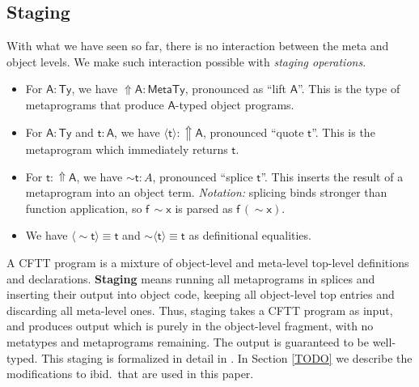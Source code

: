 \documentclass[acmsmall,screen,review,anonymous]{acmart}
\newcommand{\msf}[1]{{\mathsf{#1}}}
\newcommand{\bs}[1]{\boldsymbol{#1}}
\newcommand{\vA}{\mathsf{A}}
\newcommand{\vx}{\mathsf{x}}
\newcommand{\vf}{\mathsf{f}}
\newcommand{\vt}{\mathsf{t}}
\newcommand{\Lift}{{\Uparrow}}
\newcommand{\spl}{{\bs{\sim}}}
\newcommand{\ql}{{\bs{\langle}}}
\newcommand{\qr}{{\bs{\rangle}}}
\newcommand{\MTy}{\msf{MetaTy}}
\newcommand{\Ty}{\msf{Ty}}
\theoremstyle{remark}
\begin{document}

\subsection{Staging}\label{sec:staging}

With what we have seen so far, there is no interaction between the meta and
object levels. We make such interaction possible with \emph{staging operations}.

\begin{itemize}
\item For $\vA : \Ty$, we have $\Lift \vA : \MTy$, pronounced as ``lift $\vA$''. This is
      the type of metaprograms that produce $\vA$-typed object programs.
\item For $\vA : \Ty$ and $\vt : \vA$, we have $\ql \vt \qr : \Lift \vA$, pronounced ``quote $\vt$''. This
      is the metaprogram which immediately returns $\vt$.
\item For $\vt : \Lift \vA$, we have $\spl \vt : A$, pronounced ``splice $\vt$''. This
  inserts the result of a metaprogram into an object term. \emph{Notation:}
  splicing binds stronger than function application, so $\vf\,\spl \vx$ is parsed as
  $\vf\,(\spl \vx)$.
\item We have $\ql \spl \vt \qr \equiv \vt$ and $\spl \ql \vt \qr \equiv \vt$ as definitional equalities.
\end{itemize}

A CFTT program is a mixture of object-level and meta-level top-level definitions
and declarations. \textbf{Staging} means running all metaprograms in splices and
inserting their output into object code, keeping all object-level top entries
and discarding all meta-level ones. Thus, staging takes a CFTT program as input,
and produces output which is purely in the object-level fragment, with no
metatypes and metaprograms remaining. The output is guaranteed to be
well-typed. This staging is formalized in detail in \cite{TODO}. In Section
\ref{TODO} we describe the modifications to ibid.\ that are used in this paper.
\end{document}
